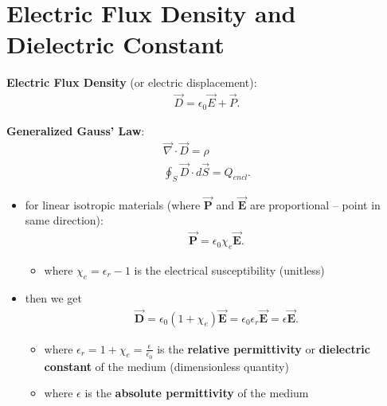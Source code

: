 \documentclass[10pt]{article}
\begin{document}
\section{Electric Flux Density and Dielectric Constant}
\begin{definition}
    \textbf{Electric Flux Density} (or electric displacement):
    \begin{gather*}
        \vec{D} = \epsilon_0 \vec{E} + \vec{P}
    .\end{gather*}
\end{definition}
\begin{theorem}
    \textbf{Generalized Gauss' Law}:
    \begin{gather*}
        \vec{\nabla} \cdot \vec{D} = \rho \\ 
        \oint_{S} \vec{D} \cdot d\vec{S} = Q_{encl}  
    .\end{gather*}
\end{theorem}
\begin{itemize}
    \item for linear isotropic materials (where $ \bm{\vec{P}} $ and $ \bm{\vec{E}} $ are proportional -- point in same direction):
        \begin{gather*}
            \bm{\vec{P}} = \epsilon_0 \chi_e \bm{\vec{E}}
        .\end{gather*}
        \begin{itemize}
            \item where $\chi_e = \epsilon_r - 1$ is the electrical susceptibility (unitless)
        \end{itemize}
    \item then we get
        \begin{gather*}
            \bm{\vec{D} } = \epsilon_0(1+\chi_e) \bm{\vec{E} } = \epsilon_0 \epsilon_r \bm{\vec{E} } = \epsilon \bm{\vec{E} }   
        .\end{gather*}
        \begin{itemize}
            \item where $\epsilon_r = 1 + \chi_e = \frac{\epsilon}{\epsilon_0}$ is the \textbf{relative permittivity} or \textbf{dielectric constant} of the medium (dimensionless quantity)
            \item where $\epsilon$ is the \textbf{absolute permittivity} of the medium
        \end{itemize}
\end{itemize}
\end{document}
